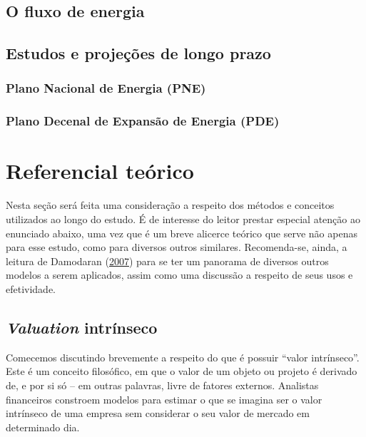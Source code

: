 \documentclass[grad,numbers]{coppe}
\begin{document}
  \hypertarget{o-fluxo-de-energia}{%
  \section{O fluxo de energia}\label{o-fluxo-de-energia}}

  \hypertarget{estudos-e-projeuxe7uxf5es-de-longo-prazo}{%
  \section{Estudos e projeções de longo prazo}\label{estudos-e-projeuxe7uxf5es-de-longo-prazo}}

  \hypertarget{plano-nacional-de-energia-pne}{%
  \subsection{Plano Nacional de Energia (PNE)}\label{plano-nacional-de-energia-pne}}

  \hypertarget{plano-decenal-de-expansuxe3o-de-energia-pde}{%
  \subsection{Plano Decenal de Expansão de Energia (PDE)}\label{plano-decenal-de-expansuxe3o-de-energia-pde}}

  \hypertarget{referencial-teuxf3rico}{%
  \chapter{Referencial teórico}\label{referencial-teuxf3rico}}

  Nesta seção será feita uma consideração a respeito dos métodos e conceitos utilizados ao longo do estudo. É de interesse do leitor prestar especial atenção ao enunciado abaixo, uma vez que é um breve alicerce teórico que serve não apenas para esse estudo, como para diversos outros similares. Recomenda-se, ainda, a leitura de Damodaran (\protect\hyperlink{ref-damodaran2007}{2007}) para se ter um panorama de diversos outros modelos a serem aplicados, assim como uma discussão a respeito de seus usos e efetividade.

  \hypertarget{valuation-intruxednseco}{%
  \section{\texorpdfstring{\emph{Valuation} intrínseco}{Valuation intrínseco}}\label{valuation-intruxednseco}}

  Comecemos discutindo brevemente a respeito do que é possuir ``valor intrínseco''. Este é um conceito filosófico, em que o valor de um objeto ou projeto é derivado de, e por si só -- em outras palavras, livre de fatores externos. Analistas financeiros constroem modelos para estimar o que se imagina ser o valor intrínseco de uma empresa sem considerar o seu valor de mercado em determinado dia.
\end{document}
